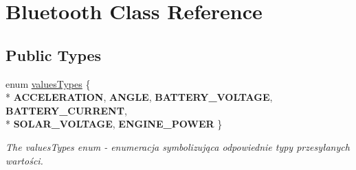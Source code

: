 \hypertarget{class_bluetooth}{}\section{Bluetooth Class Reference}
\label{class_bluetooth}
\subsection*{Public Types}
\begin{DoxyCompactItemize}
\item 
\hypertarget{class_bluetooth_a536240e6a8686ee703909e464ec0d6a3}{}enum \hyperlink{class_bluetooth_a536240e6a8686ee703909e464ec0d6a3}{values\+Types} \{ \\*
{\bfseries A\+C\+C\+E\+L\+E\+R\+A\+T\+I\+O\+N}, 
{\bfseries A\+N\+G\+L\+E}, 
{\bfseries B\+A\+T\+T\+E\+R\+Y\+\_\+\+V\+O\+L\+T\+A\+G\+E}, 
{\bfseries B\+A\+T\+T\+E\+R\+Y\+\_\+\+C\+U\+R\+R\+E\+N\+T}, 
\\*
{\bfseries S\+O\+L\+A\+R\+\_\+\+V\+O\+L\+T\+A\+G\+E}, 
{\bfseries E\+N\+G\+I\+N\+E\+\_\+\+P\+O\+W\+E\+R}
 \}\label{class_bluetooth_a536240e6a8686ee703909e464ec0d6a3}

\begin{DoxyCompactList}\small\item\em The values\+Types enum -\/ enumeracja symbolizująca odpowiednie typy przesyłanych wartości. \end{DoxyCompactList}\end{DoxyCompactItemize}
